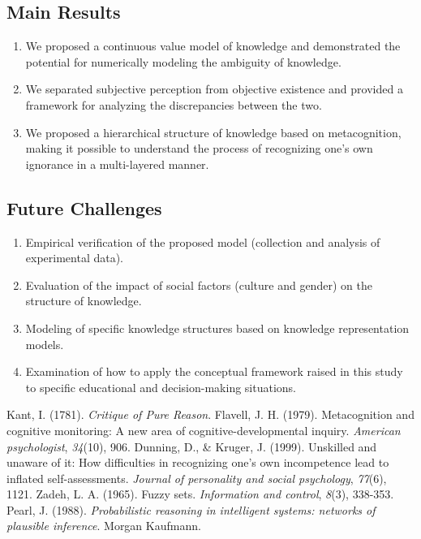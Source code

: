 \documentclass{article}
\begin{document}
\subsection{Main Results}
\begin{enumerate}
    \item We proposed a continuous value model of knowledge and demonstrated the potential for numerically modeling the ambiguity of knowledge.
    \item We separated subjective perception from objective existence and provided a framework for analyzing the discrepancies between the two.
    \item We proposed a hierarchical structure of knowledge based on metacognition, making it possible to understand the process of recognizing one's own ignorance in a multi-layered manner.
\end{enumerate}

\subsection{Future Challenges}
\begin{enumerate}
    \item Empirical verification of the proposed model (collection and analysis of experimental data).
    \item Evaluation of the impact of social factors (culture and gender) on the structure of knowledge.
    \item Modeling of specific knowledge structures based on knowledge representation models.
    \item Examination of how to apply the conceptual framework raised in this study to specific educational and decision-making situations.
\end{enumerate}

\begin{thebibliography}{9}
         Kant, I. (1781). \textit{Critique of Pure Reason}.
        Flavell, J. H. (1979). Metacognition and cognitive monitoring: A new area of cognitive-developmental inquiry. \textit{American psychologist}, \textit{34}(10), 906.
        Dunning, D., \& Kruger, J. (1999). Unskilled and unaware of it: How difficulties in recognizing one's own incompetence lead to inflated self-assessments. \textit{Journal of personality and social psychology}, \textit{77}(6), 1121.
        Zadeh, L. A. (1965). Fuzzy sets. \textit{Information and control}, \textit{8}(3), 338-353.
        Pearl, J. (1988). \textit{Probabilistic reasoning in intelligent systems: networks of plausible inference}. Morgan Kaufmann.
\end{thebibliography}
\end{document}
